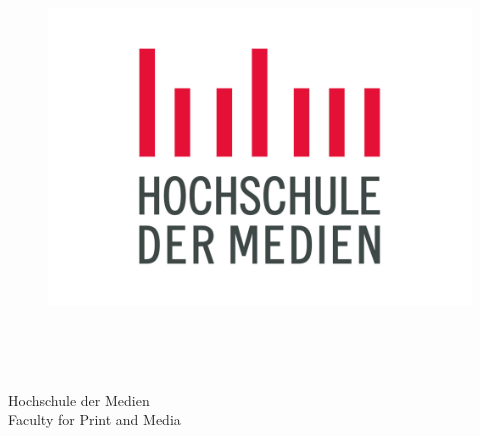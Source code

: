 \thispagestyle{empty}


\begin{figure}[t]
\begin{center}
 \includegraphics[scale=0.2]{abb/logo1}
\end{center}

~~~~~~~~~~
\end{figure}
\vspace{-2cm}

\begin{verbatim}


\end{verbatim}

\begin{center}
\Large{Hochschule der Medien}\\
\Large{Faculty for Print and Media}\\
\end{center}


